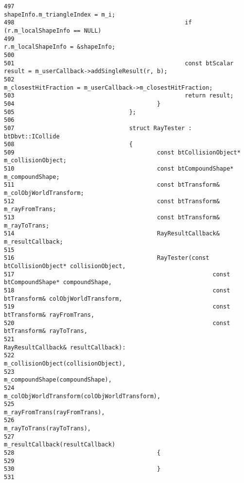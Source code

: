 \begin{Code}
\begin{verbatim}
497                                                 shapeInfo.m_triangleIndex = m_i;
498                                                 if (r.m_localShapeInfo == NULL)
499                                                         r.m_localShapeInfo = &shapeInfo;
500 
501                                                 const btScalar result = m_userCallback->addSingleResult(r, b);
502                                                 m_closestHitFraction = m_userCallback->m_closestHitFraction;
503                                                 return result;
504                                         }
505                                 };
506                                 
507                                 struct RayTester : btDbvt::ICollide
508                                 {
509                                         const btCollisionObject* m_collisionObject;
510                                         const btCompoundShape* m_compoundShape;
511                                         const btTransform& m_colObjWorldTransform;
512                                         const btTransform& m_rayFromTrans;
513                                         const btTransform& m_rayToTrans;
514                                         RayResultCallback& m_resultCallback;
515                                         
516                                         RayTester(const btCollisionObject* collisionObject,
517                                                         const btCompoundShape* compoundShape,
518                                                         const btTransform& colObjWorldTransform,
519                                                         const btTransform& rayFromTrans,
520                                                         const btTransform& rayToTrans,
521                                                         RayResultCallback& resultCallback):
522                                                 m_collisionObject(collisionObject),
523                                                 m_compoundShape(compoundShape),
524                                                 m_colObjWorldTransform(colObjWorldTransform),
525                                                 m_rayFromTrans(rayFromTrans),
526                                                 m_rayToTrans(rayToTrans),
527                                                 m_resultCallback(resultCallback)
528                                         {
529                                                 
530                                         }
531                                         

\end{verbatim}
\end{Code}
